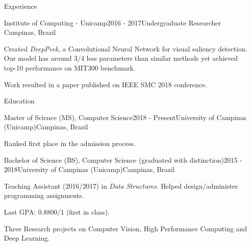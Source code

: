 \documentclass[8pt]{resume}
\newcommand{\tit}[1]{\textit{#1}}
\begin{document}
\begin{rSection}{Experience}
\begin{rSubsection}{Institute of Computing - Unicamp}{2016 - 2017}{Undergraduate Researcher}
    {Campinas, Brazil}
    \item Created \tit{DeepPeek}, a Convolutional Neural Network for visual saliency detection.
        Our model has around 3/4 less parameters than similar methods yet
        achieved top-10 performance on MIT300 benchmark.
    \item Work resulted in a paper published on IEEE SMC 2018 conference.
\end{rSubsection}
\end{rSection}

\begin{rSection}{Education}
\begin{rSubsection}{Master of Science (MS), Computer Science}{2018 - Present}{University of Campinas (Unicamp)}{Campinas, Brazil}
    \item Ranked first place in the admission process.
\end{rSubsection}

\begin{rSubsection}{Bachelor of Science (BS), Computer Science (graduated with distinction)}{2015 - 2018}{University of Campinas (Unicamp)}{Campinas, Brazil}
    \item Teaching Assistant (2016/2017) in \tit{Data Structures}. Helped
        design/administer programming assignments.
    \item Last GPA: 0.8800/1 (first in class).
    \item Three Research projects on Computer Vision, High Performance Computing and Deep Learning.
\end{rSubsection}
\end{rSection}
\end{document}
